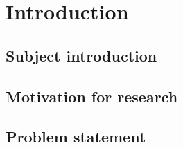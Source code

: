 \documentclass[a4paper, 10pt, english, onecolumn]{article}
\title{\fontfamily{phv}\selectfont{Causal Discovery methods for Effective Connectivity in Human Brains}}
\author{
  \textbf{R. Janssen} - \href{mailto:ramon.janssen@student.ru.nl}{ramon.janssen@student.ru.nl} \\
  \textbf{T. de Ruijter} - \href{mailto:t.deruijter@student.ru.nl}{t.deruijter@student.ru.nl}\\
}
\date{\fontfamily{ptm}\selectfont{\small{\bfseries{\today - Radboud
Universiteit Nijmegen}}}\\[0.5cm]\rule{\linewidth}{0.3mm}}
\begin{document}
\maketitle

\setlength{\parindent}{0.0cm}
\setlength{\parskip}{3mm plus2mm minus1.5mm}

\begin{abstract}
\end{abstract}
\section{Introduction}
\subsection{Subject introduction}

\subsection{ Motivation for research}

\subsection{Problem statement}
\end{document}
